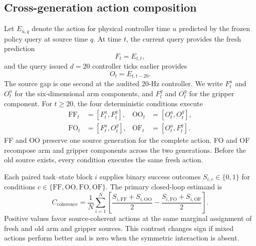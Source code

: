 
\providecommand{\gateSuccessFF}{\texttt{\detokenize{<GATE3B_SUCCESS_FF>}}}
\providecommand{\gateSuccessOO}{\texttt{\detokenize{<GATE3B_SUCCESS_OO>}}}
\providecommand{\gateSuccessFO}{\texttt{\detokenize{<GATE3B_SUCCESS_FO>}}}
\providecommand{\gateSuccessOF}{\texttt{\detokenize{<GATE3B_SUCCESS_OF>}}}
\providecommand{\gateCoherence}{\texttt{\detokenize{<GATE3B_COHERENCE>}}}
\providecommand{\gateCI}{\texttt{\detokenize{<GATE3B_CI>}}}

\subsection{Cross-generation action composition}

Let $E_{u,q}$ denote the action for physical controller time $u$ predicted by
the frozen policy query at source time $q$.  At time $t$, the current query
provides the fresh prediction
\begin{equation}
F_t = E_{t,t},
\end{equation}
and the query issued $d=20$ controller ticks earlier provides
\begin{equation}
O_t = E_{t,t-20}.
\end{equation}
The source gap is one second at the audited 20-Hz controller.  We write
$F_t^{a}$ and $O_t^{a}$ for the six-dimensional arm components, and
$F_t^{g}$ and $O_t^{g}$ for the gripper component.  For $t\geq20$, the four
deterministic conditions execute
\begin{align}
\mathrm{FF}_t &= [F_t^{a},F_t^{g}], &
\mathrm{OO}_t &= [O_t^{a},O_t^{g}],\\
\mathrm{FO}_t &= [F_t^{a},O_t^{g}], &
\mathrm{OF}_t &= [O_t^{a},F_t^{g}].
\end{align}
FF and OO preserve one source generation for the complete action.  FO and OF
recompose arm and gripper components across the two generations.  Before the
old source exists, every condition executes the same fresh action.

Each paired task--state block $i$ supplies binary success outcomes
$S_{i,c}\in\{0,1\}$ for conditions $c\in\{\mathrm{FF},\mathrm{OO},
\mathrm{FO},\mathrm{OF}\}$.  The primary closed-loop estimand is
\begin{equation}
C_{\mathrm{coherence}}=
\frac{1}{N}\sum_{i=1}^{N}
\left[
\frac{S_{i,\mathrm{FF}}+S_{i,\mathrm{OO}}}{2}
-\frac{S_{i,\mathrm{FO}}+S_{i,\mathrm{OF}}}{2}
\right].
\end{equation}
Positive values favor source-coherent actions at the same marginal assignment
of fresh and old arm and gripper sources.  This contrast changes sign if mixed
actions perform better and is zero when the symmetric interaction is absent.

